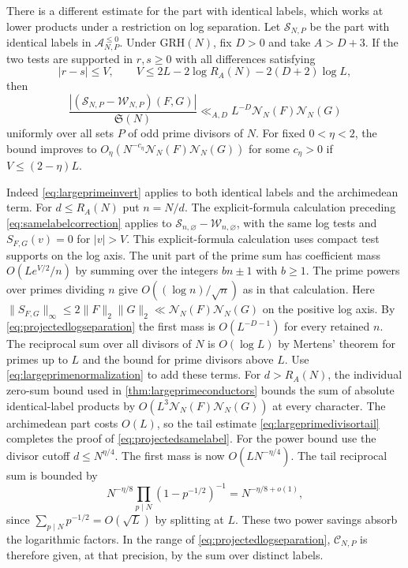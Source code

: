 \documentclass[11pt,a4paper]{article}
\numberwithin{equation}{section}
\newcommand{\SSS}{\mathfrak S}
\newcommand{\grh}{\mathrm{GRH}}
\newcommand{\NN}{\mathcal N_N}
\begin{document}
There is a different estimate for the part with identical
labels, which works at lower products under a restriction on
log separation. Let $\mathcal S_{N,P}$ be the part with
identical labels in $\mathcal A_{N,P}^{\le0}$.
Under $\grh(N)$, fix $D>0$ and take $A>D+3$. If the
two tests are supported in $r,s\ge0$ with all differences
satisfying
\begin{equation}
 |r-s|\le V,\qquad
 V\le 2L-2\log R_A(N)-2(D+2)\log L,
 \label{eq:projectedlogseparation}
\end{equation}
then
\begin{equation}
 \frac{|(\mathcal S_{N,P}-\mathcal W_{N,P})(F,G)|}{\SSS(N)}
       \ll_{A,D} L^{-D}\NN(F)\NN(G)
 \label{eq:projectedsamelabel}
\end{equation}
uniformly over all sets $P$ of odd prime divisors of $N$.
For fixed $0<\eta<2$, the bound improves to
$O_\eta(N^{-c_\eta}\NN(F)\NN(G))$ for some $c_\eta>0$
if $V\le(2-\eta)L$.

Indeed \cref{eq:largeprimeinvert} applies to both identical
labels and the archimedean term. For $d\le R_A(N)$ put
$n=N/d$. The explicit-formula calculation preceding
\cref{eq:samelabelcorrection} applies to
$\mathcal S_{n,\varnothing}-\mathcal W_{n,\varnothing}$,
with the same log tests and $S_{F,G}(v)=0$ for $|v|>V$.
This explicit-formula calculation uses compact test
supports on the log axis. The unit part of
the prime sum has coefficient mass
$O(Le^{V/2}/n)$ by summing over the integers $bn\pm1$
with $b\ge1$. The prime powers over primes dividing $n$
give $O((\log n)/\sqrt n)$ as in that calculation.
Here $\|S_{F,G}\|_\infty\le2\|F\|_2\|G\|_2\ll\NN(F)\NN(G)$
on the positive log axis. By \cref{eq:projectedlogseparation}
the first mass is $O(L^{-D-1})$ for every retained $n$.
The reciprocal sum over all divisors of $N$ is $O(\log L)$
by Mertens' theorem for primes up to $L$ and the bound for
prime divisors above $L$. Use \cref{eq:largeprimenormalization}
to add these terms.
For $d>R_A(N)$, the individual zero-sum bound used in
\cref{thm:largeprimeconductors} bounds the sum of absolute
identical-label products by $O(L^3\NN(F)\NN(G))$ at
every character. The archimedean part costs $O(L)$,
so the tail estimate \eqref{eq:largeprimedivisortail}
completes the proof of \cref{eq:projectedsamelabel}.
For the power bound use the divisor cutoff $d\le N^{\eta/4}$.
The first mass is now $O(LN^{-\eta/4})$. The tail reciprocal
sum is bounded by
\[
 N^{-\eta/8}\prod_{p\mid N}(1-p^{-1/2})^{-1}
       = N^{-\eta/8+o(1)},
\]
since $\sum_{p\mid N}p^{-1/2}=O(\sqrt L)$ by splitting at $L$.
These two power savings absorb the logarithmic factors.
In the range of \cref{eq:projectedlogseparation},
$\mathcal C_{N,P}$ is therefore given, at that precision, by
the sum over distinct labels.
\end{document}
